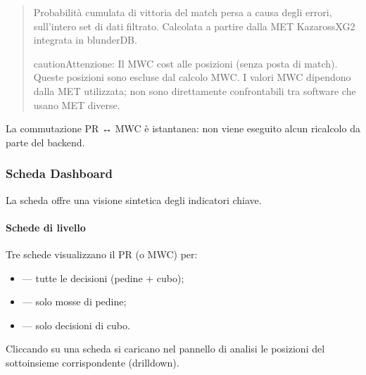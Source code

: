 \documentclass[letterpaper,10pt,italian]{sphinxmanual}
\begin{document}
\sphinxAtStartPar
{}
\begin{quote}

\sphinxAtStartPar
Probabilità cumulata di vittoria del match persa a causa degli errori, sull’intero set di dati filtrato. Calcolata a partire dalla MET Kazaross\sphinxhyphen{}XG2 integrata in blunderDB.

\begin{sphinxadmonition}{caution}{Attenzione:}
\sphinxAtStartPar
Il MWC cost  alle posizioni  (senza posta di match). Queste posizioni sono escluse dal calcolo MWC. I valori MWC dipendono dalla MET utilizzata; non sono direttamente confrontabili tra software che usano MET diverse.
\end{sphinxadmonition}
\end{quote}

\sphinxAtStartPar
La commutazione PR ↔ MWC è istantanea: non viene eseguito alcun ricalcolo da parte del backend.


\subsubsection{Scheda Dashboard}
\label{\detokenize{manuel:onglet-dashboard}}
\sphinxAtStartPar
La scheda  offre una visione sintetica degli indicatori chiave.


\paragraph{Schede di livello}
\label{\detokenize{manuel:cartes-de-niveau}}
\sphinxAtStartPar
Tre schede visualizzano il PR (o MWC) per:
\begin{itemize}
\item {} 
\sphinxAtStartPar
{} — tutte le decisioni (pedine + cubo);

\item {} 
\sphinxAtStartPar
{} — solo mosse di pedine;

\item {} 
\sphinxAtStartPar
{} — solo decisioni di cubo.

\end{itemize}

\sphinxAtStartPar
Cliccando su una scheda si caricano nel pannello di analisi le posizioni del sottoinsieme corrispondente (drill\sphinxhyphen{}down).
\end{document}
